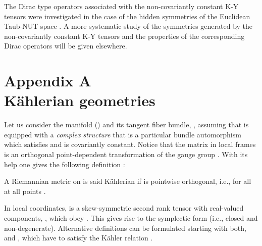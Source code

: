 \documentclass[a4paper,12pt]{article}
\begin{document}
The Dirac type operators associated with the non-covariantly constant 
K-Y tensors were investigated in the case of the hidden symmetries of 
the Euclidean Taub-NUT space \cite{CV}. 
A more systematic study of the symmetries generated by the 
non-co\-va\-ri\-ant\-ly constant K-Y tensors and the properties of the 
corresponding Dirac operators will be given elsewhere.


\setcounter{equation}{0} \renewcommand{\theequation}
{A.\arabic{equation}}

\section*{Appendix A\\K\" ahlerian geometries}


Let us consider the manifold \coordHE{} (\coordHE{}) and its tangent fiber bundle, 
\coordHE{},  assuming that \coordHE{} is equipped with a 
{\em  complex structure} that is a particular bundle automorphism 
\coordHE{} which satisfies 
\coordHE{} and is covariantly constant. 
Notice that the matrix \coordHE{} in local frames is an orthogonal
point-dependent transformation of the gauge group \coordHE{}.
With its help one gives the following definition \cite{LM,GM}: 
\begin{defin} 
A Riemannian metric \coordHE{} on \coordHE{} is said K\" ahlerian if \coordHE{} is 
pointwise orthogonal, i.e., \coordHE{} for all \coordHE{} at all points \coordHE{}. 
\end{defin}  
In local coordinates, \coordHE{} is a skew-symmetric second rank tensor with 
real-valued components, \coordHE{}, 
which obey \coordHE{}. This gives rise to the 
symplectic form \coordHE{} 
(i.e., closed and non-degenerate). 
Alternative definitions can be formulated starting with both, \coordHE{} and 
\myHighlight{$\tilde\omega$}\coordHE{}, which have to satisfy the K\" ahler relation 
\coordHE{} \cite{GM}.    
\end{document}
